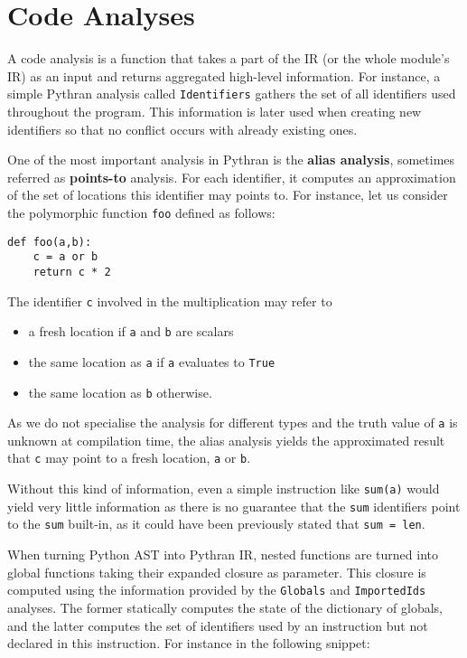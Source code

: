 \documentclass[10pt, onecolumn, preprint]{sigplanconf}
\begin{document}
\section{Code Analyses}
\label{sec:analysis}

A code analysis is a function that takes a part of the IR (or the whole
module's IR) as an input and returns aggregated high-level information. For
instance, a simple Pythran analysis called \texttt{Identifiers} gathers the set
of all identifiers used throughout the program. This information is later used
when creating new identifiers so that no conflict occurs with already existing ones.

One of the most important analysis in Pythran is the \textbf{alias analysis}, sometimes
referred as \textbf{points-to} analysis. For each identifier, it computes an
approximation of the set of locations this identifier may points to. For
instance, let us consider the polymorphic function \texttt{foo} defined as follows:

\begin{lstlisting}
def foo(a,b):
    c = a or b
    return c * 2
\end{lstlisting}

The identifier \texttt{c} involved in the multiplication may refer to

\begin{itemize}
    \item a fresh location if \texttt{a} and \texttt{b} are scalars

    \item the same location as \texttt{a} if \texttt{a} evaluates to \texttt{True}

    \item the same location as \texttt{b} otherwise.

\end{itemize}

As we do not specialise the analysis for different types and the truth value of
\texttt{a} is unknown at compilation time, the alias analysis yields %
the approximated result that \texttt{c} may point to a fresh location, 
\texttt{a} or \texttt{b}.

Without this kind of information, even a simple instruction like
\texttt{sum(a)} would yield very little information as there is no guarantee that
the \texttt{sum} identifiers point to the \texttt{sum} built-in, as it could have been 
previously stated that \texttt{sum = len}.

When turning Python AST into Pythran IR, nested functions are turned into
global functions taking their expanded closure as parameter. This closure is
computed using the information provided by the \texttt{Globals} and
\texttt{ImportedIds} analyses. The former statically computes the state of the
dictionary of globals, and the latter computes the set of identifiers used by
an instruction but not declared in this instruction. For instance in the
following snippet:
\end{document}
